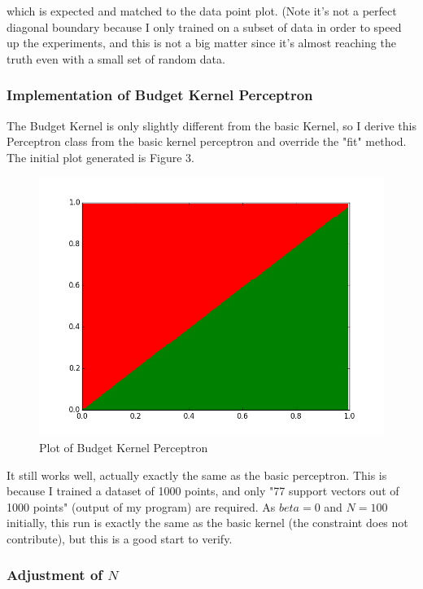 \documentclass[submit]{harvardml}
\begin{document}
which is expected and matched to the data point plot. (Note it's not a perfect diagonal boundary because I only trained on a subset of data in order to speed up the experiments, and this is not a big matter since it's almost reaching the truth even with a small set of random data.

\subsubsection*{Implementation of Budget Kernel Perceptron}

The Budget Kernel is only slightly different from the basic Kernel, so I derive this Perceptron class from the basic kernel perceptron and override the "fit" method. The initial plot generated is Figure 3.

 \begin{figure}
     \centering
     \includegraphics[scale=0.3]{bk.png}
     \caption{Plot of Budget Kernel Perceptron}
 \end{figure}

It still works well, actually exactly the same as the basic perceptron. This is because I trained a dataset of 1000 points, and only "77 support vectors out of 1000 points" (output of my program) are required. As $beta=0$ and $N=100$ initially, this run is exactly the same as the basic kernel (the constraint does not contribute), but this is a good start to verify.

\subsubsection*{Adjustment of $N$}
\end{document}
